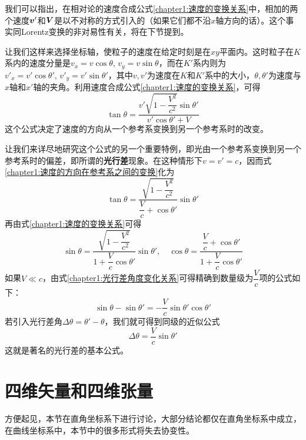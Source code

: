 我们可以指出，在相对论的速度合成公式\eqref{chapter1:速度的变换关系}中，相加的两个速度$\boldsymbol{v}'$和$\boldsymbol{V}$是以不对称的方式引入的（如果它们都不沿$x$轴方向的话）。这个事实同Lorentz变换的非对易性有关，将在下节提到。

让我们这样来选择坐标轴，使粒子的速度在给定时刻是在$xy$平面内。这时粒子在$K$系内的速度分量是$v_x=v\cos \theta,\,v_y=v\sin \theta$，而在$K'$系内则为$v'_x=v'\cos \theta',\,v'_y=v'\sin \theta'$，其中$v,v'$为速度在$K$和$K'$系中的大小，$\theta,\theta'$为速度与$x$轴和$x'$轴的夹角。利用速度合成公式\eqref{chapter1:速度的变换关系}，可得
\begin{equation}
	\tan \theta = \frac{v'\sqrt{1-\dfrac{V^2}{c^2}}\sin \theta'}{v'\cos \theta'+V}
	\label{chapter1:速度的方向在参考系之间的变换}
\end{equation}
这个公式决定了速度的方向从一个参考系变换到另一个参考系时的改变。

让我们来详尽地研究这个公式的另一个重要特例，即光由一个参考系变换到另一个参考系时的偏差，即所谓的{\bf 光行差}现象。在这种情形下$v=v'=c$，因而式\eqref{chapter1:速度的方向在参考系之间的变换}化为
\begin{equation}
	\tan \theta = \frac{\sqrt{1-\dfrac{V^2}{c^2}}}{\dfrac{V}{c}+\cos \theta'}\sin \theta'
\end{equation}
再由式\eqref{chapter1:速度的变换关系}可得
\begin{equation}
	\sin \theta = \frac{\sqrt{1-\dfrac{V^2}{c^2}}}{1+\dfrac{V}{c}\cos \theta'}\sin \theta',\quad \cos \theta = \frac{\dfrac{V}{c}+\cos \theta'}{1+\dfrac{V}{c}\cos \theta'}
	\label{chapter1:光行差角度变化关系}
\end{equation}
如果$V \ll c$，由式\eqref{chapter1:光行差角度变化关系}可得精确到数量级为$\dfrac{V}{c}$项的公式如下：
\begin{equation*}
	\sin \theta - \sin \theta' = -\frac{V}{c}\sin \theta'\cos \theta'
\end{equation*}
若引入光行差角$\Delta \theta = \theta'-\theta$，我们就可得到同级的近似公式
\begin{equation}
	\Delta \theta = \frac{V}{c} \sin \theta'
\end{equation}
这就是著名的光行差的基本公式。

\section{四维矢量和四维张量}

方便起见，本节在直角坐标系下进行讨论，大部分结论都仅在直角坐标系中成立，在曲线坐标系中，本节中的很多形式将失去协变性。

